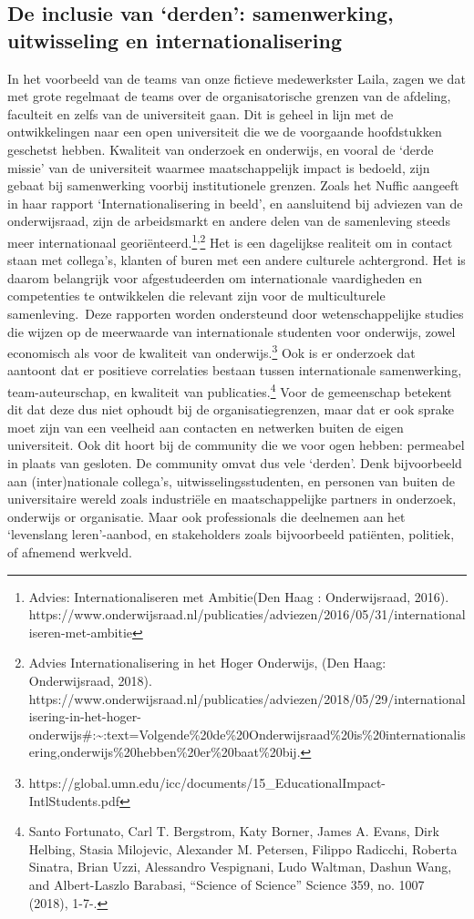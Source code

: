 \documentclass{jote-book}
\begin{document}
	\subsection{De inclusie van ‘derden': samenwerking, uitwisseling en internationalisering}



	In het voorbeeld van de teams van onze fictieve medewerkster Laila, zagen we dat met grote regelmaat de teams over de organisatorische grenzen van de afdeling, faculteit en zelfs van de universiteit gaan. Dit is geheel in lijn met de ontwikkelingen naar een open universiteit die we de voorgaande hoofdstukken geschetst hebben. Kwaliteit van onderzoek en onderwijs, en vooral de ‘derde missie' van de universiteit waarmee maatschappelijk impact is bedoeld, zijn gebaat bij samenwerking voorbij institutionele grenzen. Zoals het Nuffic aangeeft in haar rapport ‘Internationalisering in beeld', en aansluitend bij adviezen van de onderwijsraad, zijn de arbeidsmarkt en andere delen van de samenleving steeds meer internationaal georiënteerd.\footnote{Advies: Internationaliseren met Ambitie(Den Haag : Onderwijsraad, 2016). https://www.onderwijsraad.nl/publicaties/adviezen/2016/05/31/internationaliseren-met-ambitie}\textsuperscript{,}\footnote{Advies Internationalisering in het Hoger Onderwijs, (Den Haag: Onderwijsraad, 2018). https://www.onderwijsraad.nl/publicaties/adviezen/2018/05/29/internationalisering-in-het-hoger-onderwijs\#:\textasciitilde{}:text=Volgende\%20de\%20Onderwijsraad\%20is\%20internationalisering,onderwijs\%20hebben\%20er\%20baat\%20bij.} Het is een dagelijkse realiteit om in contact staan met collega's, klanten of buren met een andere culturele achtergrond. Het is daarom belangrijk voor afgestudeerden om internationale vaardigheden en competenties te ontwikkelen die relevant zijn voor de multiculturele samenleving. Deze rapporten worden ondersteund door wetenschappelijke studies die wijzen op de meerwaarde van internationale studenten voor onderwijs, zowel economisch als voor de kwaliteit van onderwijs.\footnote{https://global.umn.edu/icc/documents/15\_EducationalImpact-IntlStudents.pdf} Ook is er onderzoek dat aantoont dat er positieve correlaties bestaan tussen internationale samenwerking, team-auteurschap, en kwaliteit van publicaties.\footnote{Santo Fortunato, Carl T. Bergstrom, Katy Borner, James A. Evans, Dirk Helbing, Stasia Milojevic, Alexander M. Petersen, Filippo Radicchi, Roberta Sinatra, Brian Uzzi, Alessandro Vespignani, Ludo Waltman, Dashun Wang, and Albert-Laszlo Barabasi, “Science of Science” Science 359, no. 1007 (2018), 1-7-. } Voor de gemeenschap betekent dit dat deze dus niet ophoudt bij de organisatiegrenzen, maar dat er ook sprake moet zijn van een veelheid aan contacten en netwerken buiten de eigen universiteit. Ook dit hoort bij de community die we voor ogen hebben: permeabel in plaats van gesloten. De community omvat dus vele ‘derden'. Denk bijvoorbeeld aan (inter)nationale collega's, uitwisselingsstudenten, en personen van buiten de universitaire wereld zoals industriële en maatschappelijke partners in onderzoek, onderwijs or organisatie. Maar ook professionals die deelnemen aan het ‘levenslang leren'-aanbod, en stakeholders zoals bijvoorbeeld patiënten, politiek, of afnemend werkveld.
\end{document}
